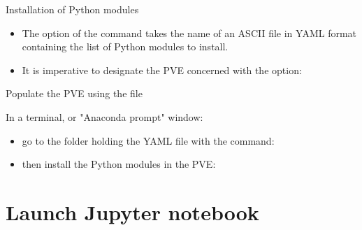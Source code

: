 \documentclass[10pt,serif,mathserif,compress,hyperref={colorlinks}]{beamer}
\begin{document}
\begin{frame}{Installation of Python modules}

  \begin{tcolorbox}[title={\bf Preferred method}: YAML file + command \textbf{conda}]
    
    \begin{itemize}
    \item The  option of the  command takes the name of an ASCII file
      in YAML format containing the list of Python modules to install.
     \item It is imperative to designate the PVE concerned with the option: \\
     \end{itemize}
    
\end{tcolorbox}

  \begin {bclogo}[noborder=true, couleur=gray!50, couleurBarre=Chocolate, logo=\bctrombone, marge=0, margeG=-.8]
    {Populate the  PVE using the file }\smallskip
    {\small In a terminal, or "Anaconda prompt" window:\\[-3mm]
      \begin{itemize}
      \item go to the folder holding the YAML file with the  command:\\
      \item then install the Python modules in the  PVE:\\
      \end{itemize}
    }
  \end{bclogo}
  
  
\end{frame}

\section{Launch Jupyter notebook}
\end{document}

